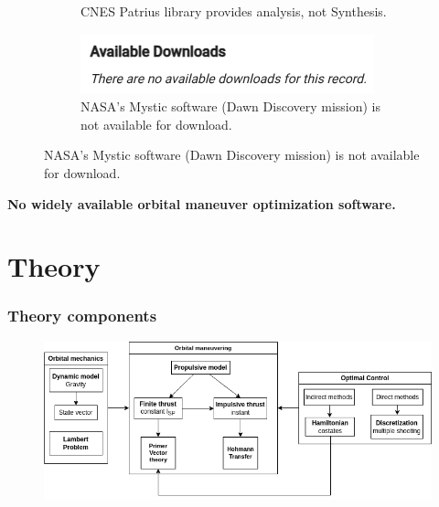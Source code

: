 \documentclass{beamer}
\begin{document}
\begin{frame}
\begin{figure}[htbp]
\begin{subfigure}{0.25\textwidth}
            \caption{CNES Patrius library provides analysis, not Synthesis.}
        \end{subfigure}
        \begin{subfigure}{0.25\textwidth}
            \centering
            \includegraphics[width=\textwidth]{img/mystic_no_download.png}
            \caption{NASA's Mystic software (Dawn Discovery mission) is not available for download.}
        \end{subfigure}
    \end{figure}

    \textbf{No widely available orbital maneuver optimization software.}
\end{frame}

\section{Theory}

\begin{frame}
    \frametitle{Theory components}

    \begin{figure}[htbp]
        \centering
        \includegraphics[width=\textwidth]{img/theory_components.png}
    \end{figure}
\end{frame}
\end{document}
